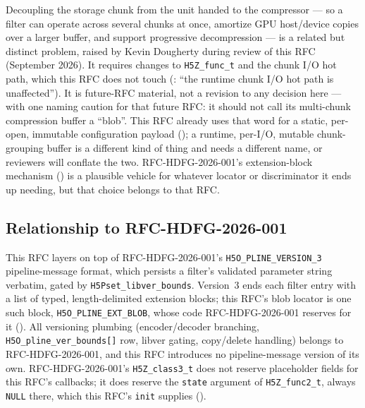 \documentclass[../RFC-HDFG-2026-003.tex]{subfiles}
\begin{document}
\begin{outofscope}
Decoupling the storage chunk from the unit handed to the compressor ---
so a filter can operate across several chunks at once, amortize GPU
host/device copies over a larger buffer, and support progressive
decompression --- is a related but distinct problem, raised by Kevin
Dougherty during review of this RFC (September 2026). It requires
changes to \texttt{H5Z\_func\_t} and the chunk I/O hot path, which this
RFC does not touch (: ``the runtime chunk I/O hot
path is unaffected''). It is future-RFC material, not a revision to
any decision here --- with one naming caution for that future RFC: it
should not call its multi-chunk compression buffer a ``blob''. This RFC
already uses that word for a static, per-open, immutable configuration
payload (); a runtime, per-I/O, mutable
chunk-grouping buffer is a different kind of thing and needs a
different name, or reviewers will conflate the two. RFC-HDFG-2026-001's
extension-block mechanism () is a plausible
vehicle for whatever locator or discriminator it ends up needing, but
that choice belongs to that RFC.
\end{outofscope}

\subsection{Relationship to RFC-HDFG-2026-001}
\label{sec:relationship}

This RFC layers on top of RFC-HDFG-2026-001's
\texttt{H5O\_PLINE\_VERSION\_3} pipeline-message format, which persists
a filter's validated parameter string verbatim, gated by
\texttt{H5Pset\_libver\_bounds}. Version~3 ends each filter entry with a list of typed,
length-delimited extension blocks; this RFC's blob locator is one such
block, \texttt{H5O\_PLINE\_EXT\_BLOB}, whose code RFC-HDFG-2026-001
reserves for it ().  All versioning plumbing
(encoder/decoder branching, \texttt{H5O\_pline\_ver\_bounds[]} row, libver
gating, copy/delete handling) belongs to RFC-HDFG-2026-001, and this RFC
introduces no pipeline-message version of its own. RFC-HDFG-2026-001's
\texttt{H5Z\_class3\_t} does not reserve placeholder fields for this
RFC's callbacks; it does reserve the \texttt{state} argument of
\texttt{H5Z\_func2\_t}, always \texttt{NULL} there, which this RFC's
\texttt{init} supplies ().

\end{document}
